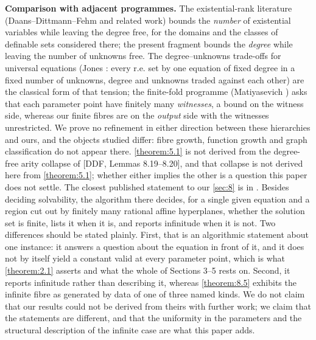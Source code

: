 \textbf{Comparison with adjacent programmes.} The existential-rank literature (Daans–Dittmann–Fehm \cite{DDF} and related work) bounds the \emph{number} of existential variables while leaving the degree free, for the domains and the classes of definable sets considered there; the present fragment bounds the \emph{degree} while leaving the number of unknowns free. The degree–unknowns trade-offs for universal equations (Jones \cite{Jon82}: every r.e. set by one equation of fixed degree in a fixed number of unknowns, degree and unknowns traded against each other) are the classical form of that tension; the finite-fold programme (Matiyasevich \cite{Mat10}) asks that each parameter point have finitely many \emph{witnesses}, a bound on the witness side, whereas our finite fibres are on the \emph{output} side with the witnesses unrestricted. We prove no refinement in either direction between these hierarchies and ours, and the objects studied differ: fibre growth, function growth and graph classification do not appear there. \cref{theorem:5.1} is not derived from the degree-free arity collapse of [DDF, Lemmas 8.19–8.20], and that collapse is not derived here from \cref{theorem:5.1}; whether either implies the other is a question this paper does not settle. The closest published statement to our \cref{sec:8} is in \cite{GS04}. Besides deciding solvability, the algorithm there decides, for a single given equation and a region cut out by finitely many rational affine hyperplanes, whether the solution set is finite, lists it when it is, and reports infinitude when it is not. Two differences should be stated plainly. First, that is an algorithmic statement about one instance: it answers a question about the equation in front of it, and it does not by itself yield a constant valid at every parameter point, which is what \cref{theorem:2.1} asserts and what the whole of Sections 3–5 rests on. Second, it reports infinitude rather than describing it, whereas \cref{theorem:8.5} exhibits the infinite fibre as generated by data of one of three named kinds. We do not claim that our results could not be derived from theirs with further work; we claim that the statements are different, and that the uniformity in the parameters and the structural description of the infinite case are what this paper adds.

